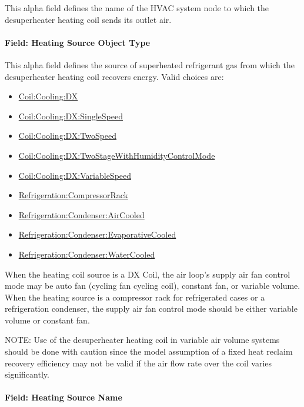 This alpha field defines the name of the HVAC system node to which the desuperheater heating coil sends its outlet air.

\paragraph{Field: Heating Source Object Type}\label{field-heating-source-object-type}

This alpha field defines the source of superheated refrigerant gas from which the desuperheater heating coil recovers energy. Valid choices are:

\begin{itemize}
\item
  \hyperref[coilcoolingdx]{Coil:Cooling:DX}
\item
  \hyperref[coilcoolingdxsinglespeed]{Coil:Cooling:DX:SingleSpeed}
\item
  \hyperref[coilcoolingdxtwospeed]{Coil:Cooling:DX:TwoSpeed}
\item
  \hyperref[coilcoolingdxtwostagewithhumiditycontrolmode]{Coil:Cooling:DX:TwoStageWithHumidityControlMode}
\item
  \hyperref[coilcoolingdxvariablespeed]{Coil:Cooling:DX:VariableSpeed}
\item
  \hyperref[refrigerationcompressorrack]{Refrigeration:CompressorRack}
\item
  \hyperref[refrigerationcondenseraircooled]{Refrigeration:Condenser:AirCooled}
\item
  \hyperref[refrigerationcondenserevaporativecooled]{Refrigeration:Condenser:EvaporativeCooled}
\item
  \hyperref[refrigerationcondenserwatercooled]{Refrigeration:Condenser:WaterCooled}
\end{itemize}

When the heating coil source is a DX Coil, the air loop's supply air fan control mode may be auto fan (cycling fan cycling coil), constant fan, or variable volume. When the heating source is a compressor rack for refrigerated cases or a refrigeration condenser, the supply air fan control mode should be either variable volume or constant fan.

NOTE: Use of the desuperheater heating coil in variable air volume systems should be done with caution since the model assumption of a fixed heat reclaim recovery efficiency may not be valid if the air flow rate over the coil varies significantly.

\paragraph{Field: Heating Source Name}\label{field-heating-source-name}

